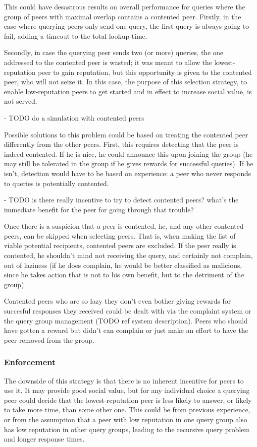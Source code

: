 This could have desastrous results on overall performance for queries where the
group of peers with maximal overlap contains a contented peer. Firstly, in the
case where querying peers only send one query, the first query is always going
to fail, adding a timeout to the total lookup time.

Secondly, in case the querying peer sends two (or more) queries, the one
addressed to the contented peer is wasted; it was meant to allow the
lowest-reputation peer to gain reputation, but this opportunity is given to the
contented peer, who will not seize it. In this case, the purpose of this
selection strategy, to enable low-reputation peers to get started and in effect
to increase social value, is not served.

- TODO do a simulation with contented peers

Possible solutions to this problem could be based on treating the contented peer
differently from the other peers. First, this requires detecting that the peer
is indeed contented. If he is nice, he could announce this upon joining the
group (he may still be tolerated in the group if he gives rewards for successful
queries). If he isn't, detection would have to be based on experience: a peer
who never responds to queries is potentially contented.

- TODO is there really incentive to try to detect contented peers? what's the
  immediate benefit for the peer for going through that trouble?

Once there is a suspicion that a peer is contented, he, and any other contented
peers, can be skipped when selecting peers. That is, when making the list of
viable potential recipients, contented peers are excluded. If the peer really is
contented, he shouldn't mind not receiving the query, and certainly not
complain, out of laziness (if he does complain, he would be better classified as
malicious, since he takes action that is not to his own benefit, but to the
detriment of the group).

Contented peers who are so lazy they don't even bother giving rewards for
succesful responses they received could be dealt with via the complaint system
or the query group management (TODO ref system description). Peers who should
have gotten a reward but didn't can complain or just make an effort to have the
peer removed from the group.

\subsubsection{Enforcement}
\label{sec:selection_overlap_rep_sorted_enforcement}
The downside of this strategy is that there is no inherent incentive for peers
to use it. It may provide good social value, but for any individual choice a
querying peer could decide that the lowest-reputation peer is less likely to
answer, or likely to take more time, than some other one. This could be from
previous experience, or from the assumption that a peer with low reputation in
one query group also has low reputation in other query groups, leading to the
recursive query problem and longer response times.

